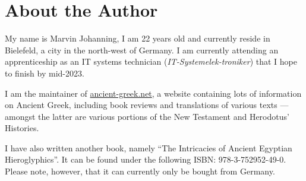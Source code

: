 \chapter*{About the Author}

My name is Marvin Johanning, I am 22 years old and currently reside in Bielefeld, a city in the north-west of Germany. I am currently attending an apprenticeship as an IT systems technician (\textit{IT-Systemelek-troniker}) that I hope to finish by mid-2023. 

I am the maintainer of \url{ancient-greek.net}, a website containing lots of information on Ancient Greek, including book reviews and translations of various texts — amongst the latter are various portions of the New Testament and Herodotus’ Histories. 

I have also written another book, namely “The Intricacies of Ancient Egyptian Hieroglyphics”. It can be found under the following ISBN: 978-3-752952-49-0. Please note, however, that it can currently only be bought from Germany. 